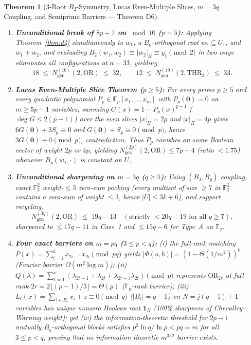 \documentclass[11pt,a4paper]{article}
\newtheorem{theorem}{Theorem}[section]
\theoremstyle{definition}
\newcommand{\F}{\mathbb{F}}
\newcommand{\OR}{\mathrm{OR}}
\newcommand{\THR}{\mathrm{THR}}
\newcommand{\Ngen}{N_{\mathrm{gen}}}
\begin{document}
\begin{theorem}[3-Root $B_2$-Symmetry, Lucas Even-Multiple Slices, $m = 3q$ Coupling, and Semiprime Barriers --- Theorem D6]
\label{thm:d6}
\begin{enumerate}[leftmargin=*,nosep]
  \item \textbf{Unconditional break of $8p - 7$ on $\bmod 10$ ($p = 5$):} Applying Theorem~\ref{thm:d4} simultaneously to $w_1$, a $B_p$-orthogonal root $w_2 \subseteq U_1$, and $w_1 + w_2$, and evaluating $B_2(w_1, w_2) \equiv |w_2|_H \equiv y_1 \pmod 2$ in two ways eliminates all configurations at $n = 33$, yielding
  \[
    18 \;\le\; \Ngen^{(10)}(2, \OR) \;\le\; 32,
    \qquad 12 \;\le\; \Ngen^{(10)}(2, \THR_2) \;\le\; 33.
  \]
  \item \textbf{Lucas Even-Multiple Slice Theorem ($p \ge 5$):} For every prime $p \ge 5$ and every quadratic polynomial $P_p \in \F_p[x_1,\dots,x_m]$ with $P_p(\mathbf{0}) = 0$ on $m \ge 5p - 1$ variables, summing $G(x) = 1 - P_p(x)^{p-1}$ ($\deg G \le 2(p-1)$) over the even slices $|x|_H = 2p$ and $|x|_H = 4p$ gives $6 G(\mathbf{0}) + 3 S_p \equiv 0$ and $G(\mathbf{0}) + S_p \equiv 0 \pmod p$, hence $3 G(\mathbf{0}) \equiv 0 \pmod p$, contradiction. Thus $P_p$ vanishes on some Boolean vector of weight $2p$ or $4p$, yielding $\Ngen^{(2p)}(2, \OR) \le 7p - 4$ (ratio $< 1.75$) whenever $B_p(w_1, \cdot)$ is constant on $U_1$.
  \item \textbf{Unconditional sharpening on $m = 3q$ ($q \ge 5$):} Using $(B_3, B_q)$ coupling, exact $\F_3^2$ weight-$\le 3$ zero-sum packing (every multiset of size $\ge 7$ in $\F_3^2$ contains a zero-sum of weight $\le 3$, hence $|U| \le 3k + 6$), and support recycling,
  \[
    \Ngen^{(3q)}(2, \OR) \;\le\; 19q - 13 \quad (\text{strictly } < 20q - 19 \text{ for all } q \ge 7),
  \]
  sharpened to $\le 17q - 11$ in Case~1 and $\le 15q - 6$ for Type~A on $\F_q$.
  \item \textbf{Four exact barriers on $m = pq$ ($3 \le p < q$):} (i) the full-rank matching $P(x) = \sum_{i=1}^k x_{2i-1}x_{2i} \pmod{pq}$ yields $|\Phi(a,b)| = (1 - \Theta(1/m^2))^k$ (Fourier barrier $\Omega(m^2 \log m)$); (ii) $Q(\lambda) = \sum_{t=1}^r (\lambda_{2t-1} + \lambda_{2t} + \lambda_{2t-1}\lambda_{2t}) \pmod p$ represents $\OR_{2r}$ at full rank $2r = 2\lfloor(p-1)/3\rfloor = \Theta(p)$ ($\F_p$-rank barrier); (iii) $L_t(x) = \sum_{i \in B_t} x_i + z \equiv 0 \pmod q$ ($|B_t| = q-1$) on $N = j(q-1)+1$ variables has unique nonzero Boolean root $\mathbf{1}_N$ (100\% sharpness of Chevalley--Warning weight); yet (iv) the information-theoretic threshold for $2p - 1$ mutually $B_q$-orthogonal blocks satisfies $p^2 \ln q / \ln p < pq = m$ for all $3 \le p < q$, proving that no information-theoretic $m^{3/2}$ barrier exists.
\end{enumerate}
\end{theorem}
\end{document}
